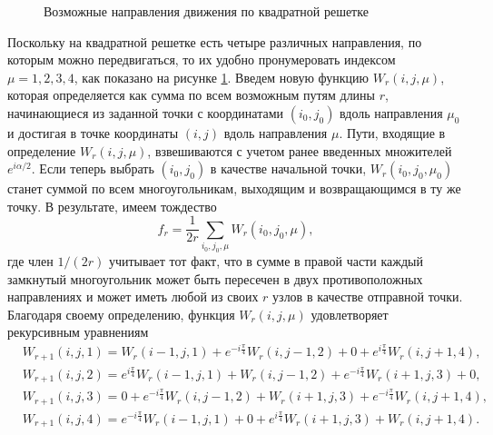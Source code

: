  \begin{figure}[h]
 	\caption{Возможные направления движения по квадратной решетке}
 	\label{dirSquare}
 \end{figure}

Поскольку на квадратной решетке есть четыре различных направления, по которым можно передвигаться, то их удобно пронумеровать индексом $\mu = 1, 2, 3, 4$, как показано на рисунке \ref{dirSquare}. Введем новую функцию $W_r (i, j, \mu)$, которая определяется как сумма по всем возможным путям длины $r$, начинающиеся из заданной точки с координатами $(i_0, j_0)$ вдоль направления $\mu_0$ и достигая в точке координаты $(i, j)$ вдоль направления $\mu$. Пути, входящие в определение $W_r (i, j, \mu)$, взвешиваются с учетом ранее введенных множителей $e^{i\alpha / 2}$. Если теперь выбрать $(i_0, j_0)$ в качестве начальной точки, $W_r (i_0, j_0, \mu_0)$ станет суммой по всем многоугольникам, выходящим и возвращающимся в ту же точку. В результате, имеем тождество
\begin{equation}
f_{r} = \frac{1}{2r} \sum_{i_0, j_0, \mu} W_r (i_0, j_0, \mu),
\label{fl}
\end{equation}
где член $1 / (2r)$ учитывает тот факт, что в сумме в правой части каждый замкнутый многоугольник может быть пересечен в двух противоположных направлениях и может иметь любой из своих $r$ узлов в качестве отправной точки. Благодаря своему определению, функция $W_r (i, j, \mu)$ удовлетворяет рекурсивным уравнениям
\begin{align}
&W_{r+1} (i, j, 1) = W_r (i − 1, j, 1) + e^{−i \frac{\pi}{4}} W_r (i, j − 1, 2) + 0 + e^{i \frac{\pi}{4}} W_r (i, j + 1, 4), \nonumber \\
&W_{r+1} (i, j, 2) = e^{i \frac{\pi}{4}} W_r (i − 1, j, 1) + W_r (i, j − 1, 2) + e^{−i \frac{\pi}{4}} W_r (i + 1, j, 3) + 0, \nonumber\\
& W_{r+1} (i, j, 3) = 0 + e^{−i \frac{\pi}{4}} W_r (i, j − 1, 2) + W_r (i + 1, j, 3) + e^{-i\frac{\pi}{4}} W_r (i, j + 1, 4), \nonumber\\
& W_{r+1} (i, j, 4) = e^{−i \frac{\pi}{4}} W_r (i − 1, j, 1) + 0 + e^{i \frac{\pi}{4}} W_r (i + 1, j, 3) + W_r (i, j + 1, 4).
\label{eq}
\end{align}

